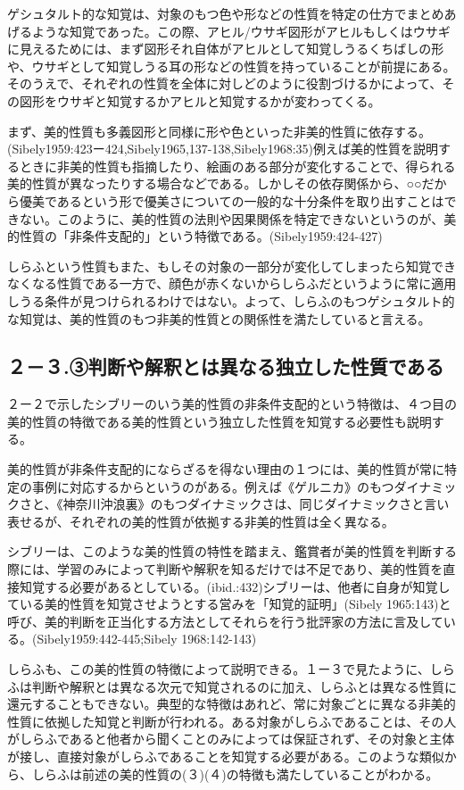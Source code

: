 \documentclass[b5j,twoside,twocolumn]{utarticle}
\begin{document}
{ゲシュタルト的な知覚は、対象のもつ色や形などの性質を特定の仕方でまとめあげるような知覚であった。この際、アヒル/ウサギ図形がアヒルもしくはウサギに見えるためには、まず図形それ自体がアヒルとして知覚しうるくちばしの形や、ウサギとして知覚しうる耳の形などの性質を持っていることが前提にある。そのうえで、それぞれの性質を全体に対しどのように役割づけるかによって、その図形をウサギと知覚するかアヒルと知覚するかが変わってくる。

まず、美的性質も多義図形と同様に形や色といった非美的性質に依存する。(Sibely1959:423ー424,Sibely1965,137-138,Sibely1968:35)例えば美的性質を説明するときに非美的性質も指摘したり、絵画のある部分が変化することで、得られる美的性質が異なったりする場合などである。しかしその依存関係から、○○だから優美であるという形で優美さについての一般的な十分条件を取り出すことはできない。このように、美的性質の法則や因果関係を特定できないというのが、美的性質の「非条件支配的」という特徴である。(Sibely1959:424-427)

しらふという性質もまた、もしその対象の一部分が変化してしまったら知覚できなくなる性質である一方で、顔色が赤くないからしらふだというように常に適用しうる条件が見つけられるわけではない。よって、しらふのもつゲシュタルト的な知覚は、美的性質のもつ非美的性質との関係性を満たしていると言える。

\subsection{２－３.③判断や解釈とは異なる独立した性質である}

２ー２で示したシブリーのいう美的性質の非条件支配的という特徴は、４つ目の美的性質の特徴である美的性質という独立した性質を知覚する必要性も説明する。

美的性質が非条件支配的にならざるを得ない理由の１つには、美的性質が常に特定の事例に対応するからというのがある。例えば《ゲルニカ》のもつダイナミックさと、《神奈川沖浪裏》のもつダイナミックさは、同じダイナミックさと言い表せるが、それぞれの美的性質が依拠する非美的性質は全く異なる。

シブリーは、このような美的性質の特性を踏まえ、鑑賞者が美的性質を判断する際には、学習のみによって判断や解釈を知るだけでは不足であり、美的性質を直接知覚する必要があるとしている。(ibid.:432)シブリーは、他者に自身が知覚している美的性質を知覚させようとする営みを「知覚的証明」(Sibely 1965:143)と呼び、美的判断を正当化する方法としてそれらを行う批評家の方法に言及している。(Sibely1959:442-445;Sibely 1968:142-143)

しらふも、この美的性質の特徴によって説明できる。１ー３で見たように、しらふは判断や解釈とは異なる次元で知覚されるのに加え、しらふとは異なる性質に還元することもできない。典型的な特徴はあれど、常に対象ごとに異なる非美的性質に依拠した知覚と判断が行われる。ある対象がしらふであることは、その人がしらふであると他者から聞くことのみによっては保証されず、その対象と主体が接し、直接対象がしらふであることを知覚する必要がある。このような類似から、しらふは前述の美的性質の(３)(４)の特徴も満たしていることがわかる。

}
\end{document}
